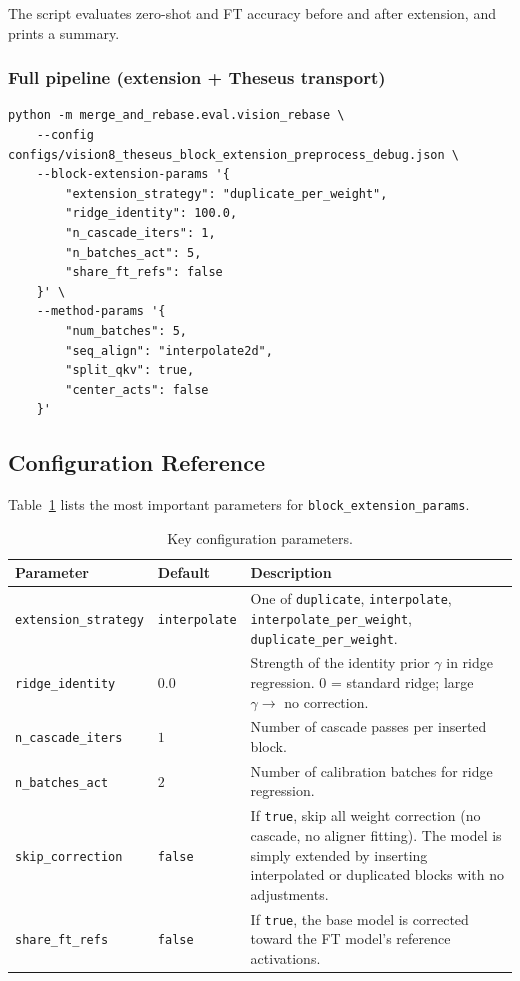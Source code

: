 \documentclass[11pt,a4paper]{article}
\begin{document}
The script evaluates zero-shot and FT accuracy before and after extension,
and prints a summary.

\subsubsection{Full pipeline (extension + Theseus transport)}
\label{subsec:run_full}

\begin{lstlisting}
python -m merge_and_rebase.eval.vision_rebase \
    --config configs/vision8_theseus_block_extension_preprocess_debug.json \
    --block-extension-params '{
        "extension_strategy": "duplicate_per_weight",
        "ridge_identity": 100.0,
        "n_cascade_iters": 1,
        "n_batches_act": 5,
        "share_ft_refs": false
    }' \
    --method-params '{
        "num_batches": 5,
        "seq_align": "interpolate2d",
        "split_qkv": true,
        "center_acts": false
    }'
\end{lstlisting}

\subsection{Configuration Reference}

Table~\ref{tab:config} lists the most important parameters for
\texttt{block\_extension\_params}.

\begin{table}[ht]
\centering
\caption{Key configuration parameters.}
\label{tab:config}
\begin{tabular}{llp{6cm}}
\toprule
Parameter & Default & Description \\
\midrule
\texttt{extension\_strategy} &
  \texttt{interpolate} &
  One of \texttt{duplicate}, \texttt{interpolate},
  \texttt{interpolate\_per\_weight}, \texttt{duplicate\_per\_weight}. \\
\texttt{ridge\_identity} & $0.0$ &
  Strength of the identity prior $\gamma$ in ridge regression.
  $0$ = standard ridge; large $\gamma \to$ no correction. \\
\texttt{n\_cascade\_iters} & $1$ &
  Number of cascade passes per inserted block. \\
\texttt{n\_batches\_act} & $2$ &
  Number of calibration batches for ridge regression. \\
\texttt{skip\_correction} & \texttt{false} &
  If \texttt{true}, skip all weight correction
  (no cascade, no aligner fitting). The model is simply extended
  by inserting interpolated or duplicated blocks with no adjustments. \\
\texttt{share\_ft\_refs} & \texttt{false} &
  If \texttt{true}, the base model is corrected toward the FT model's
  reference activations. \\
\bottomrule
\end{tabular}
\end{table}
\end{document}

